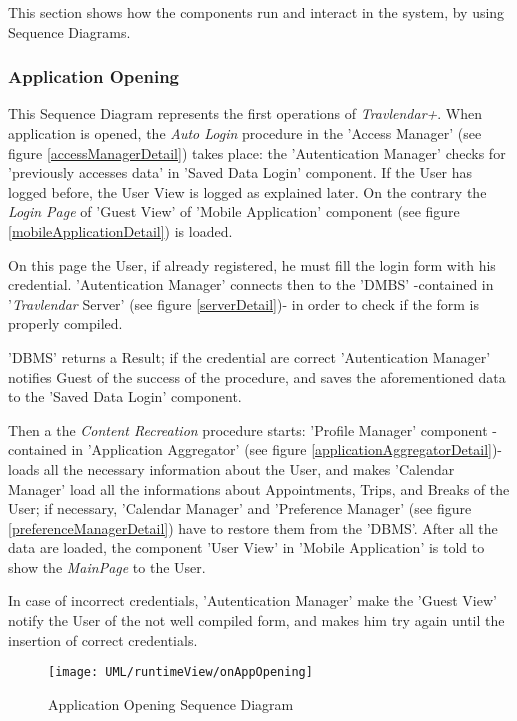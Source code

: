This section shows how the components run and interact in the system, by using Sequence Diagrams.

\subsubsection{Application Opening}

	This Sequence Diagram represents the first operations of \textit{Travlendar+}.
	When application is opened, the \textsl{Auto Login} procedure in the 'Access Manager' (see figure \ref{accessManagerDetail}) takes place: the 'Autentication Manager' checks for 'previously accesses data' in 'Saved Data Login' component. If the User has logged before, the User View is logged as explained later.
	On the contrary the \textsl{Login Page} of 'Guest View' of 'Mobile Application' component  (see figure \ref{mobileApplicationDetail}) is loaded.
	
	On this page the User, if already registered, he must fill the login form with his credential.
	'Autentication Manager' connects then to the 'DMBS' -contained in '\textit{Travlendar} Server' (see figure \ref{serverDetail})- in order to check if the form is properly compiled.
	
	'DBMS' returns a Result; if the credential are correct 'Autentication Manager' notifies Guest of the success of the procedure, and saves the aforementioned data to the 'Saved Data Login' component.
	
	Then a the \textsl{Content Recreation} procedure starts:
	'Profile Manager' component -contained in 'Application Aggregator' (see figure \ref{applicationAggregatorDetail})- loads all the necessary information about the User, and makes 'Calendar Manager' load all the informations about Appointments, Trips, and Breaks of the User; if necessary, 'Calendar Manager' and 'Preference Manager' (see figure \ref{preferenceManagerDetail}) have to restore them from the 'DBMS'.
	After all the data are loaded, the component 'User View' in 'Mobile Application' is told to show the \textsl{MainPage} to the User.
	
	In case of incorrect credentials, 'Autentication Manager' make the 'Guest View' notify the User of the not well compiled form, and makes him try again until the insertion of correct credentials.
	
	\begin{figure}[H]
		\centering
		\texttt{[image: UML/runtimeView/onAppOpening]}
		\caption{Application Opening Sequence Diagram}
		\label{loginRunTimeView}
	\end{figure}
	

